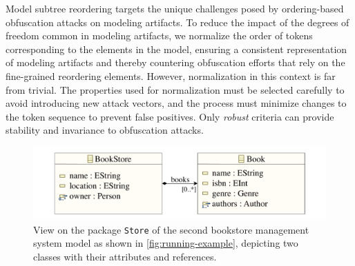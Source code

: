 Model subtree reordering targets the unique challenges posed by ordering-based obfuscation attacks on modeling artifacts.
To reduce the impact of the degrees of freedom common in modeling artifacts, we normalize the order of tokens corresponding to the elements in the model, ensuring a consistent representation of modeling artifacts and thereby countering obfuscation efforts that rely on the fine-grained reordering elements.
However, normalization in this context is far from trivial.
The properties used for normalization must be selected carefully to avoid introducing new attack vectors, and the process must minimize changes to the token sequence to prevent false positives.
Only \textit{robust} criteria can provide stability and invariance to obfuscation attacks.

\begin{samepage}
\begin{figure}[b]
    \includegraphics[width=\textwidth]{figures/mde/bookstore-view.pdf}
    \caption[Bookstore Model View]{View on the package \texttt{Store} of the second bookstore management system model as shown in \autoref{fig:running-example}, depicting two classes with their attributes and references.}
    \label{fig:example-view}
\end{figure}


\end{samepage}
